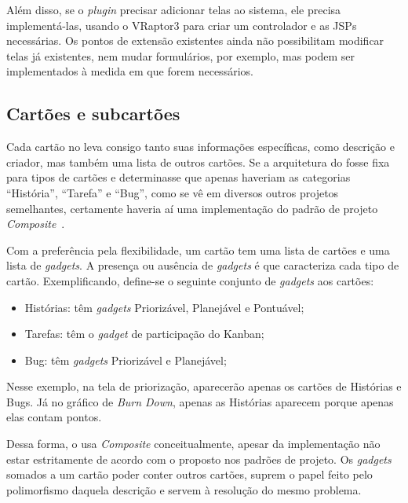 Além disso, se o \textit{plugin} precisar adicionar telas ao sistema, ele precisa implementá-las, usando o VRaptor3 para criar um controlador e as JSPs necessárias. Os pontos de extensão existentes ainda não possibilitam modificar telas já existentes, nem mudar formulários, por exemplo, mas podem ser implementados à medida em que forem necessários.

\subsection{Cartões e subcartões}

Cada cartão no \calopsita{} leva consigo tanto suas informações específicas, como descrição e criador, mas também uma lista de outros cartões. Se a arquitetura do \calopsita{} fosse fixa para tipos de cartões e determinasse que apenas haveriam as categorias ``História'', ``Tarefa'' e ``Bug'', como se vê em diversos outros projetos semelhantes, certamente haveria aí uma implementação do padrão de projeto \textit{Composite}~\cite{gof}.

Com a preferência pela flexibilidade, um cartão tem uma lista de cartões e uma lista de \textit{gadgets}. A presença ou ausência de \textit{gadgets} é que caracteriza cada tipo de cartão. Exemplificando, define-se o seguinte conjunto de \textit{gadgets} aos cartões:

\begin{itemize}
	\item{Histórias: têm \textit{gadgets} Priorizável, Planejável e Pontuável;}
	\item{Tarefas: têm o \textit{gadget} de participação do Kanban;}
	\item{Bug: têm \textit{gadgets} Priorizável e Planejável;}
\end{itemize}

Nesse exemplo, na tela de priorização, aparecerão apenas os cartões de Histórias e Bugs. Já no gráfico de \textit{Burn Down}, apenas as Histórias aparecem porque apenas elas contam pontos.

Dessa forma, o \calopsita{} usa \textit{Composite} conceitualmente, apesar da implementação não estar estritamente de acordo com o proposto nos padrões de projeto. Os \textit{gadgets} somados a um cartão poder conter outros cartões, suprem o papel feito pelo polimorfismo daquela descrição e servem à resolução do mesmo problema. 
